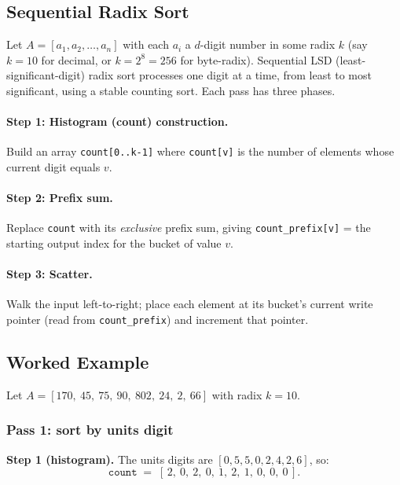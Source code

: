 \subsection{Sequential Radix Sort}
Let $A = [a_1, a_2, \ldots, a_n]$ with each $a_i$ a $d$-digit number in
some radix $k$ (say $k = 10$ for decimal, or $k = 2^8 = 256$ for
byte-radix). Sequential LSD (least-significant-digit) radix sort
processes one digit at a time, from least to most significant, using a
stable counting sort. Each pass has three phases.

\paragraph{Step 1: Histogram (count) construction.}
Build an array \texttt{count[0..k-1]} where \texttt{count[v]} is the
number of elements whose current digit equals $v$.

\paragraph{Step 2: Prefix sum.}
Replace \texttt{count} with its \emph{exclusive} prefix sum, giving
\texttt{count\_prefix[v]} = the starting output index for the bucket
of value $v$.

\paragraph{Step 3: Scatter.}
Walk the input left-to-right; place each element at its bucket's current
write pointer (read from \texttt{count\_prefix}) and increment that
pointer.

\subsection{Worked Example}
\label{sec:radix-example}
Let $A = [170,\ 45,\ 75,\ 90,\ 802,\ 24,\ 2,\ 66]$ with radix $k=10$.

\subsubsection*{Pass 1: sort by units digit}

\textbf{Step 1 (histogram).} The units digits are
$[0, 5, 5, 0, 2, 4, 2, 6]$, so:
\[
\texttt{count} \;=\; [\,2,\ 0,\ 2,\ 0,\ 1,\ 2,\ 1,\ 0,\ 0,\ 0\,].
\]

